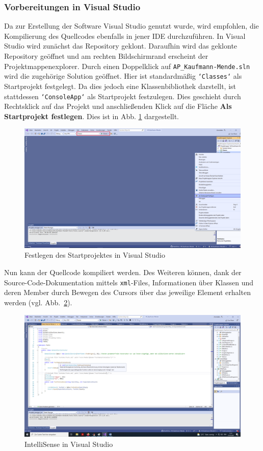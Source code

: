 \documentclass[doktyp=parbeit]{TUBAFarbeiten}
\begin{document}
\subsubsection{Vorbereitungen in Visual Studio}
Da zur Erstellung der Software Visual Studio genutzt wurde, wird empfohlen, die Kompilierung des Quellcodes ebenfalls in jener IDE durchzuführen. In Visual Studio wird zunächst das Repository geklont. Daraufhin wird das geklonte Repository geöffnet und am rechten Bildschirmrand erscheint der Projektmappenexplorer. Durch einen Doppelklick auf \linebreak \texttt{AP\_Kaufmann-Mende.sln} wird die zugehörige Solution geöffnet. 
Hier ist standardmäßig \linebreak \texttt{`Classes`} als Startprojekt festgelegt. Da dies jedoch eine Klassenbibliothek darstellt, ist stattdessen \texttt{`ConsoleApp`} als Startprojekt festzulegen. Dies geschieht durch Rechtsklick auf das Projekt und anschließenden Klick auf die Fläche \textbf{Als Startprojekt festlegen}. Dies ist in Abb. \ref{fig:startprojekt} dargestellt. 
\begin{figure}
	\centering
	\includegraphics[width=1\linewidth]{Bilder/Startprojekt}
	\caption{Festlegen des Startprojektes in Visual Studio}
	\label{fig:startprojekt}
\end{figure}
Nun kann der Quellcode kompiliert werden. 
Des Weiteren können, dank der Source-Code-Dokumentation mittels \texttt{xml}-Files, Informationen über Klassen und deren Member durch Bewegen des Cursors über das jeweilige Element erhalten werden (vgl. Abb.~\ref{fig:intellisense}).
\begin{figure}
	\centering
	\includegraphics[width=1\linewidth]{Bilder/IntelliSense}
	\caption{IntelliSense in Visual Studio}
	\label{fig:intellisense}
\end{figure}
\end{document}
